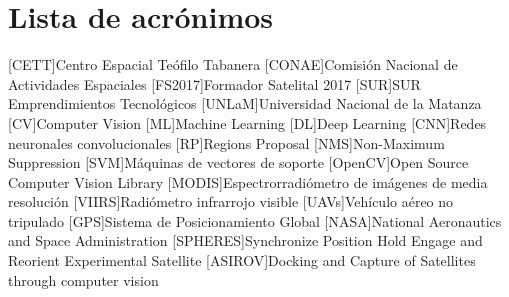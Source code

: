 \chapter*{Lista de acrónimos}
\label{chap:acronimos}

\begin{acronym}
[CETT]{Centro Espacial Teófilo Tabanera}
[CONAE]{Comisión Nacional de Actividades Espaciales}
[FS2017]{Formador Satelital 2017}
[SUR]{SUR Emprendimientos Tecnológicos}
[UNLaM]{Universidad Nacional de la Matanza}
[CV]{Computer Vision}
[ML]{Machine Learning}
[DL]{Deep Learning}
[CNN]{Redes neuronales convolucionales}
[RP]{Regions Proposal}
[NMS]{Non-Maximum Suppression}
[SVM]{Máquinas de vectores de soporte}
[OpenCV]{Open Source Computer Vision Library}
[MODIS]{Espectrorradiómetro de imágenes de media resolución}
[VIIRS]{Radiómetro infrarrojo visible}
[UAVs]{Vehículo aéreo no tripulado}
[GPS]{Sistema de Posicionamiento Global}
[NASA]{National Aeronautics and Space Administration}
[SPHERES]{Synchronize Position Hold Engage and Reorient Experimental Satellite}
 [ASIROV]{Docking and Capture of Satellites through computer vision}
\end{acronym}


